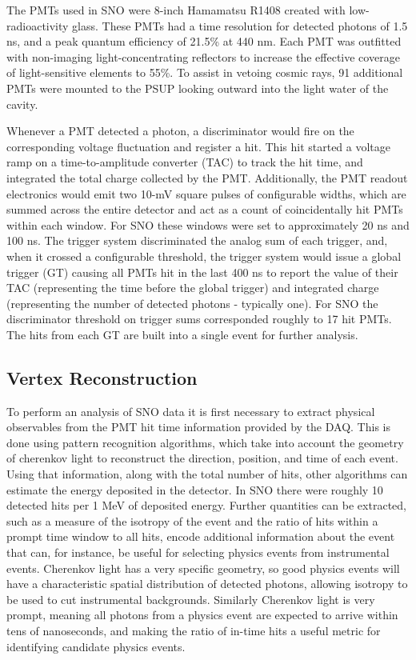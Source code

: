 The PMTs used in SNO were 8-inch Hamamatsu R1408 created with low-radioactivity glass. 
These PMTs had a time resolution for detected photons of 1.5 ns, and a peak quantum efficiency of 21.5\% at 440 nm.
Each PMT was outfitted with non-imaging light-concentrating reflectors to increase the effective coverage of light-sensitive elements to 55\%.
To assist in vetoing cosmic rays, 91 additional PMTs were mounted to the PSUP looking outward into the light water of the cavity. 

Whenever a PMT detected a photon, a discriminator would fire on the corresponding voltage fluctuation and register a hit.
This hit started a voltage ramp on a time-to-amplitude converter (TAC) to track the hit time, and integrated the total charge collected by the PMT.
Additionally, the PMT readout electronics would emit two  10-mV square pulses of configurable widths, which are summed across the entire detector and act as a count of coincidentally hit PMTs within each window.
For SNO these windows were set to approximately 20 ns and 100 ns.
The trigger system discriminated the analog sum of each trigger, and, when it crossed a configurable threshold, the trigger system would issue a global trigger (GT) causing all PMTs hit in the last 400 ns to report the value of their TAC (representing the time before the global trigger) and integrated charge (representing the number of detected photons - typically one).
For SNO the discriminator threshold on trigger sums corresponded roughly to 17 hit PMTs.
The hits from each GT are built into a single event for further analysis.

\subsection{Vertex Reconstruction}

To perform an analysis of SNO data it is first necessary to extract physical observables from the PMT hit time information provided by the DAQ.
This is done using pattern recognition algorithms, which take into account the geometry of cherenkov light to reconstruct the direction, position, and time of each event.
Using that information, along with the total number of hits, other algorithms can estimate the energy deposited in the detector. 
In SNO there were roughly 10 detected hits per 1 MeV of deposited energy.
Further quantities can be extracted, such as a measure of the isotropy of the event and the ratio of hits within a prompt time window to all hits, encode additional information about the event that can, for instance, be useful for selecting physics events from instrumental events.
Cherenkov light has a very specific geometry, so good physics events will have a characteristic spatial distribution of detected photons, allowing isotropy to be used to cut instrumental backgrounds.
Similarly Cherenkov light is very prompt, meaning all photons from a physics event are expected to arrive within tens of nanoseconds, and making the ratio of in-time hits a useful metric for identifying candidate physics events. 

